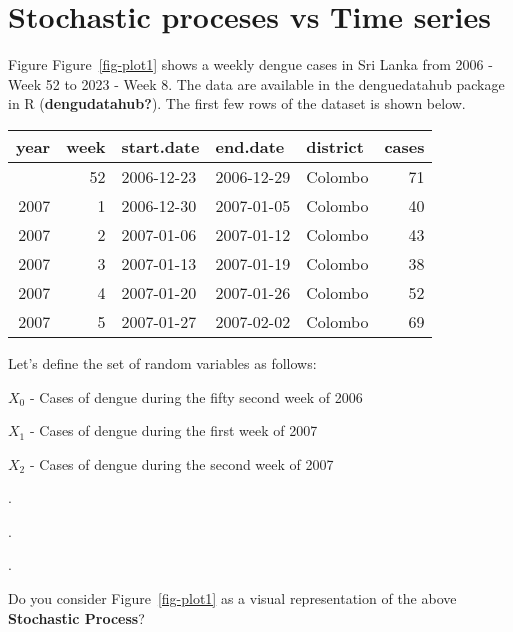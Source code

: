 \documentclass[
  letterpaper,
  DIV=11,
  numbers=noendperiod]{scrreprt}
\begin{document}
\section{Stochastic proceses vs Time
series}\label{stochastic-proceses-vs-time-series}

Figure Figure~\ref{fig-plot1} shows a weekly dengue cases in Sri Lanka
from 2006 - Week 52 to 2023 - Week 8. The data are available in the
denguedatahub package in R (\textbf{dengudatahub?}). The first few rows
of the dataset is shown below.

\begin{longtable}[]{@{}rrlllr@{}}
\toprule\noalign{}
year & week & start.date & end.date & district & cases \\
\midrule\noalign{}
\endhead
\bottomrule\noalign{}
\endlastfoot
2006 & 52 & 2006-12-23 & 2006-12-29 & Colombo & 71 \\
2007 & 1 & 2006-12-30 & 2007-01-05 & Colombo & 40 \\
2007 & 2 & 2007-01-06 & 2007-01-12 & Colombo & 43 \\
2007 & 3 & 2007-01-13 & 2007-01-19 & Colombo & 38 \\
2007 & 4 & 2007-01-20 & 2007-01-26 & Colombo & 52 \\
2007 & 5 & 2007-01-27 & 2007-02-02 & Colombo & 69 \\
\end{longtable}

Let's define the set of random variables as follows:

\(X_0\) - Cases of dengue during the fifty second week of 2006

\(X_1\) - Cases of dengue during the first week of 2007

\(X_2\) - Cases of dengue during the second week of 2007

.

.

.

Do you consider Figure~\ref{fig-plot1} as a visual representation of the
above \textbf{Stochastic Process}?
\end{document}
